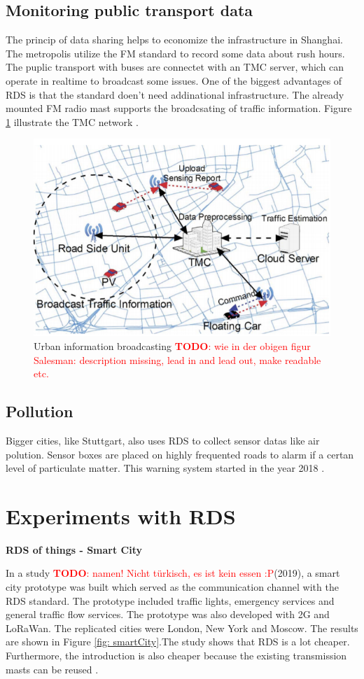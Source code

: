 \documentclass[conference,12pt,a4paper]{IEEEtran}
\newcommand{\todo}[1]{\textcolor{red}{\textbf{TODO}: #1}}
\begin{document}
	
	\subsection{Monitoring public transport data}
	
	The princip of data sharing helps to economize the infrastructure in Shanghai. The metropolis utilize the FM standard to record some data about rush hours. The puplic transport with buses are connectet with an TMC server, which can operate in realtime to broadcast some issues. One of the biggest advantages of RDS is that the standard doen't need addinational infrastructure. The already mounted FM radio mast supports the broadcsating of traffic information. Figure \ref{fig: monitoring} illustrate the TMC network \cite{Monitoring-du2014effective}.
	
	\begin{figure}[h]
		\centering
		\includegraphics[width =0.5 \linewidth]{img/monitoring}
		\caption{Urban information broadcasting \todo{wie in der obigen figur Salesman: description missing, lead in and lead out, make readable etc.}}
		\label{fig: monitoring}
	\end{figure}
	
	
	\subsection{Pollution}
	
	Bigger cities, like Stuttgart, also uses RDS to collect sensor datas like air polution. Sensor boxes are placed on highly frequented roads to alarm if a certan level of particulate matter. This warning system started in the year 2018 \cite{Stuttgart}.\\			 
	
	
	\section{Experiments with RDS} %
	\textbf{RDS of things - Smart City}
	
	In a study \todo{namen! Nicht türkisch, es ist kein essen :P}(2019), a smart city prototype was built which served as the communication channel with the RDS standard. The prototype included traffic lights, emergency services and general traffic flow services. The prototype was also developed with 2G and LoRaWan. The replicated cities were London, New York and Moscow. The results are shown in Figure \ref{fig: smartCity}.The study shows that RDS is a lot cheaper. Furthermore, the introduction is also cheaper because the existing transmission masts can be reused \cite{SmartCity-kutlay2019rds}.
	
\end{document}
